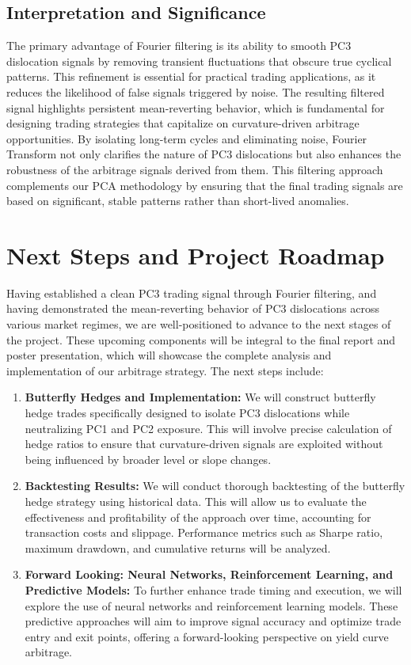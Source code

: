 \documentclass[12pt]{article}
\begin{document}
\subsection{Interpretation and Significance}
The primary advantage of Fourier filtering is its ability to smooth PC3 dislocation signals by removing transient fluctuations that obscure true cyclical patterns. This refinement is essential for practical trading applications, as it reduces the likelihood of false signals triggered by noise. The resulting filtered signal highlights persistent mean-reverting behavior, which is fundamental for designing trading strategies that capitalize on curvature-driven arbitrage opportunities. By isolating long-term cycles and eliminating noise, Fourier Transform not only clarifies the nature of PC3 dislocations but also enhances the robustness of the arbitrage signals derived from them. This filtering approach complements our PCA methodology by ensuring that the final trading signals are based on significant, stable patterns rather than short-lived anomalies.

\section{Next Steps and Project Roadmap}

Having established a clean PC3 trading signal through Fourier filtering, and having demonstrated the mean-reverting behavior of PC3 dislocations across various market regimes, we are well-positioned to advance to the next stages of the project. These upcoming components will be integral to the final report and poster presentation, which will showcase the complete analysis and implementation of our arbitrage strategy. The next steps include:

\begin{enumerate}
    \item \textbf{Butterfly Hedges and Implementation:} 
    We will construct butterfly hedge trades specifically designed to isolate PC3 dislocations while neutralizing PC1 and PC2 exposure. This will involve precise calculation of hedge ratios to ensure that curvature-driven signals are exploited without being influenced by broader level or slope changes.

    \item \textbf{Backtesting Results:} 
    We will conduct thorough backtesting of the butterfly hedge strategy using historical data. This will allow us to evaluate the effectiveness and profitability of the approach over time, accounting for transaction costs and slippage. Performance metrics such as Sharpe ratio, maximum drawdown, and cumulative returns will be analyzed.

    \item \textbf{Forward Looking: Neural Networks, Reinforcement Learning, and Predictive Models:} 
    To further enhance trade timing and execution, we will explore the use of neural networks and reinforcement learning models. These predictive approaches will aim to improve signal accuracy and optimize trade entry and exit points, offering a forward-looking perspective on yield curve arbitrage.

\end{enumerate}
\end{document}
